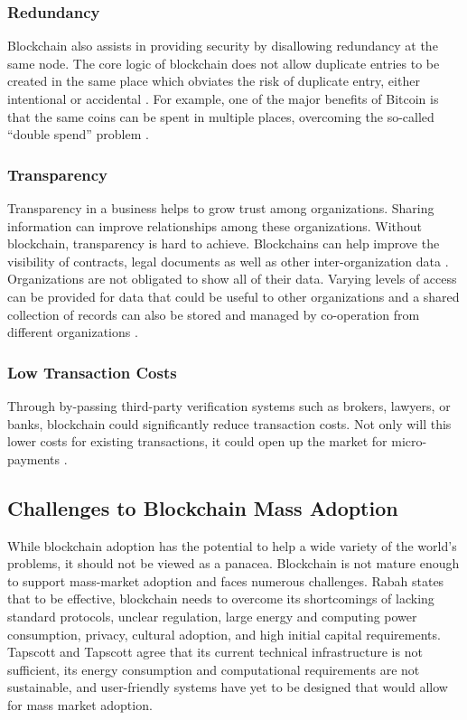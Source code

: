 \documentclass[sigconf]{acmart}
\begin{document}
\subsubsection{Redundancy} Blockchain also assists in providing security by disallowing redundancy at the same node. The core logic of blockchain does not allow duplicate entries to be created in the same place which obviates the risk of duplicate entry, either intentional or accidental \cite{arbc4}.  For example, one of the major benefits of Bitcoin is that the same coins can be spent in multiple places, overcoming the so-called  ``double spend'' problem \cite{tapscott}.

\subsubsection{Transparency} Transparency in a business helps to grow trust among organizations. Sharing information can improve relationships among these organizations. Without blockchain, transparency is hard to achieve. Blockchains can help improve the visibility of contracts, legal documents as well as other inter-organization data \cite{pabc1}. Organizations are not obligated to show all of their data. Varying levels of access can be provided for data that could be useful to other organizations and a shared collection of records can also be stored and managed by co-operation from different organizations \cite{tapscott}.

\subsubsection{Low Transaction Costs} Through by-passing third-party verification systems such as brokers, lawyers, or banks, blockchain could significantly reduce transaction costs. Not only will this lower costs for existing transactions, it could open up the market for micro-payments \cite{hbr}. 

\subsection{Challenges to Blockchain Mass Adoption}
While blockchain adoption has the potential to help a wide variety of the world's problems, it should not be viewed as a panacea.  Blockchain is not mature enough to support mass-market adoption and faces numerous challenges. Rabah \cite{rabah2017overview} states that to be effective, blockchain needs to overcome its shortcomings of lacking standard protocols, unclear regulation, large energy and computing power consumption, privacy, cultural adoption, and high initial capital requirements. Tapscott and Tapscott \cite{tapscott} agree that its current technical infrastructure is not sufficient, its energy consumption and computational requirements are not sustainable, and user-friendly systems have yet to be designed that would allow for mass market adoption.
\end{document}
